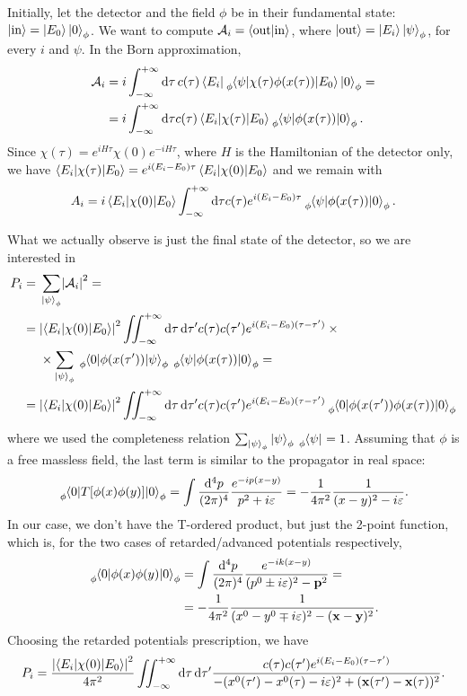 \documentclass[a4paper,12pt]{book}
\DeclarePairedDelimiter{\abs}{\lvert}{\rvert}
\renewcommand{\vec}{\mathbf}
\newcommand{\dd}{\mathop{\mathrm{d}\!}{}}
\renewcommand{\epsilon}{\varepsilon}
\theoremstyle{definition}
\theoremstyle{remark}
\begin{document}
Initially, let the detector and the field $\phi$ be in their fundamental state: $\ket{\text{in}}=\ket{E_0}\ket{0}_\phi$. We want to compute $\mathcal A_i=\braket{\text{out}|\text{in}}$, where $\ket{\text{out}}=\ket{E_i}\ket{\psi}_\phi$, for every $i$ and $\psi$. In the Born approximation,
\begin{align*}
\mathcal A_i&=i\int_{-\infty}^{+\infty}\dd\tau\,c(\tau) \bra{E_i}\!\tensor[_\phi]{\braket{\psi|\chi(\tau)\phi(x(\tau))|E_0}\ket{0}}{_\phi}=\\
&=i\int_{-\infty}^{+\infty}\dd\tau c(\tau)\braket{E_i|\chi(\tau)|E_0}\!\tensor[_\phi]{\braket{\psi|\phi(x(\tau))|0}}{_\phi}.
\end{align*}
Since $\chi(\tau)=e^{iH\tau}\chi(0)e^{-iH\tau}$, where $H$ is the Hamiltonian of the detector only, we have $\braket{E_i|\chi(\tau)|E_0}=e^{i(E_i-E_0)\tau}\braket{E_i|\chi(0)|E_0}$ and we remain with
\[A_i=i\braket{E_i|\chi(0)|E_0}\int_{-\infty}^{+\infty}\dd\tau c(\tau)e^{i(E_i-E_0)\tau}\tensor[_\phi]{\braket{\psi|\phi(x(\tau))|0}}{_\phi}.\]

What we actually observe is just the final state of the detector, so we are interested in
\begin{align*}
P_i={}&\sum_{\ket{\psi}_\phi}\abs*{\mathcal A_i}^2=\\
={}&\abs*{\braket{E_i|\chi(0)|E_0}}^2\iint_{-\infty}^{+\infty}\dd\tau\dd\tau'c(\tau)c(\tau')e^{i(E_i-E_0)(\tau-\tau')}\times{}\\
&\times\sum_{\ket{\psi}_\phi}\tensor[_\phi]{\braket{0|\phi(x(\tau'))|\psi}}{_\phi}\tensor[_\phi]{\braket{\psi|\phi(x(\tau))|0}}{_\phi}=\\
={}&\abs*{\braket{E_i|\chi(0)|E_0}}^2\iint_{-\infty}^{+\infty}\dd\tau\dd\tau'c(\tau)c(\tau')e^{i(E_i-E_0)(\tau-\tau')}\tensor[_\phi]{\braket{0|\phi(x(\tau'))\phi(x(\tau))|0}}{_\phi}
\end{align*}
where we used the completeness relation $\sum_{\ket{\psi}_\phi}\ket{\psi}_\phi\tensor[_\phi]{\bra{\psi}}{}=1$. Assuming that $\phi$ is a free massless field, the last term is similar to the propagator in real space:
\[\tensor[_\phi]{\braket{0|T[\phi(x)\phi(y)]|0}}{_\phi}=\int\frac{\dd^4p}{(2\pi)^4}\frac{e^{-ip(x-y)}}{p^2+i\epsilon}=-\frac1{4\pi^2}\frac1{(x-y)^2-i\epsilon}.\]
In our case, we don't have the T-ordered product, but just the 2-point function, which is, for the two cases of retarded/advanced potentials respectively,
\begin{align*}
\tensor[_\phi]{\braket{0|\phi(x)\phi(y)|0}}{_\phi}&=\int\frac{\dd^4p}{(2\pi)^4}\frac{e^{-ik(x-y)}}{(p^0\pm i\epsilon)^2-\vec p^2}=\\
&=-\frac1{4\pi^2}\frac1{(x^0-y^0\mp i\epsilon)^2-(\vec x-\vec y)^2}.
\end{align*}
Choosing the retarded potentials prescription, we have
\[P_i=\frac{\abs*{\braket{E_i|\chi(0)|E_0}}^2}{4\pi^2}\iint_{-\infty}^{+\infty}\dd\tau\dd\tau'\frac{c(\tau)c(\tau')e^{i(E_i-E_0)(\tau-\tau')}}{-(x^0(\tau')-x^0(\tau)-i\epsilon)^2+(\vec x(\tau')-\vec x(\tau))^2}.\]
\end{document}
